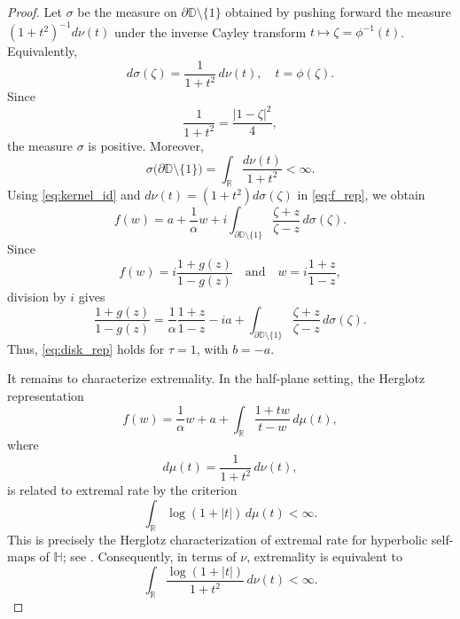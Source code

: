 \documentclass[12pt]{amsart}
\numberwithin{equation}{section}
\theoremstyle{plain}
\theoremstyle{definition}
\begin{document}
\begin{proof}
Let $\sigma$ be the measure on
$\partial\mathbb{D}\setminus\{1\}$ obtained by pushing forward the
measure $(1+t^2)^{-1}d\nu(t)$ under the inverse Cayley transform
$t\mapsto\zeta=\phi^{-1}(t)$. Equivalently,
\begin{equation}
\label{eq:sigma_definition}
d\sigma(\zeta)
=
\frac{1}{1+t^2}\,d\nu(t),
\quad
t=\phi(\zeta).
\end{equation}
Since
\begin{equation*}
\frac{1}{1+t^2}
=
\frac{|1-\zeta|^2}{4},
\end{equation*}
the measure $\sigma$ is positive. Moreover,
\begin{equation*}
\sigma\bigl(\partial\mathbb{D}\setminus\{1\}\bigr)
=
\int_{\mathbb{R}}\frac{d\nu(t)}{1+t^2}
<\infty.
\end{equation*}
Using \eqref{eq:kernel_id} and
$d\nu(t)=(1+t^2)d\sigma(\zeta)$ in \eqref{eq:f_rep}, we obtain
\begin{equation*}
f(w)
=
a+\frac{1}{\alpha}w
+i\int_{\partial\mathbb{D}\setminus\{1\}}
\frac{\zeta+z}{\zeta-z}\,d\sigma(\zeta).
\end{equation*}
Since
\begin{equation*}
f(w)=i\frac{1+g(z)}{1-g(z)}
\quad\text{and}\quad
w=i\frac{1+z}{1-z},
\end{equation*}
division by $i$ gives
\begin{equation*}
\label{eq:g_rep_tau1}
\frac{1+g(z)}{1-g(z)}
=
\frac{1}{\alpha}\frac{1+z}{1-z}
-ia
+\int_{\partial\mathbb{D}\setminus\{1\}}
\frac{\zeta+z}{\zeta-z}\,d\sigma(\zeta).
\end{equation*}
Thus, \eqref{eq:disk_rep} holds for $\tau=1$, with $b=-a$.

It remains to characterize extremality. In the half-plane setting,
the Herglotz representation
\begin{equation*}
f(w)
=
\frac{1}{\alpha}w+a
+
\int_{\mathbb{R}}
\frac{1+tw}{t-w}\,d\mu(t),
\end{equation*}
where
\begin{equation*}
d\mu(t)=\frac{1}{1+t^2}\,d\nu(t),
\end{equation*}
is related to extremal rate by the criterion
\begin{equation*}
\int_{\mathbb{R}}\log(1+|t|)\,d\mu(t)<\infty.
\end{equation*}
This is precisely the Herglotz characterization of extremal rate for
hyperbolic self-maps of $\mathbb{H}$; see
\cite[Theorem~4.4]{cruz}.
Consequently, in terms of $\nu$, extremality is equivalent to
\begin{equation}
\label{eq:half_plane_cond}
\int_{\mathbb{R}}
\frac{\log(1+|t|)}{1+t^2}\,d\nu(t)
<\infty.
\end{equation}


\end{proof}
\end{document}
